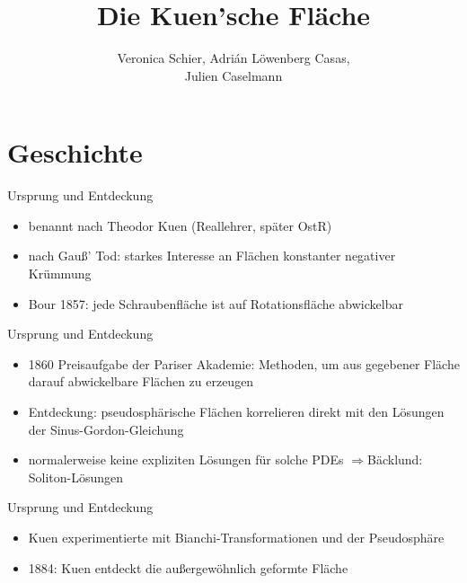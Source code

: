 \documentclass[12pt]{beamer}
\author{Veronica Schier, Adrián Löwenberg Casas, \\Julien Caselmann}
\title{Die Kuen'sche Fläche}
\begin{document}
\begin{frame}
\titlepage
\end{frame}

\begin{frame}

\tableofcontents

\end{frame}

\section{Geschichte}
\begin{frame}{Ursprung und Entdeckung}

\begin{itemize}
\item benannt nach Theodor Kuen (Reallehrer, später OstR)
\item nach Gauß' Tod: starkes Interesse an Flächen konstanter negativer Krümmung
\item Bour 1857: jede Schraubenfläche ist auf Rotationsfläche abwickelbar
\end{itemize}

\end{frame}

\begin{frame}{Ursprung und Entdeckung}

\begin{itemize}
\item 1860 Preisaufgabe der Pariser Akademie: Methoden, um aus gegebener Fläche darauf abwickelbare Flächen zu erzeugen\cite{scriba}
\item Entdeckung: pseudosphärische Flächen korrelieren direkt mit den Lösungen der Sinus-Gordon-Gleichung 
\item normalerweise keine expliziten Lösungen für solche PDEs $\Rightarrow$Bäcklund: Soliton-Lösungen \cite{bruter}
\end{itemize}

\end{frame}

\begin{frame}{Ursprung und Entdeckung}
\begin{itemize}

\item Kuen experimentierte mit Bianchi-Transformationen und der Pseudosphäre
\item 1884: Kuen entdeckt die außergewöhnlich geformte Fläche
\end{itemize}
\end{frame}
\end{document}
